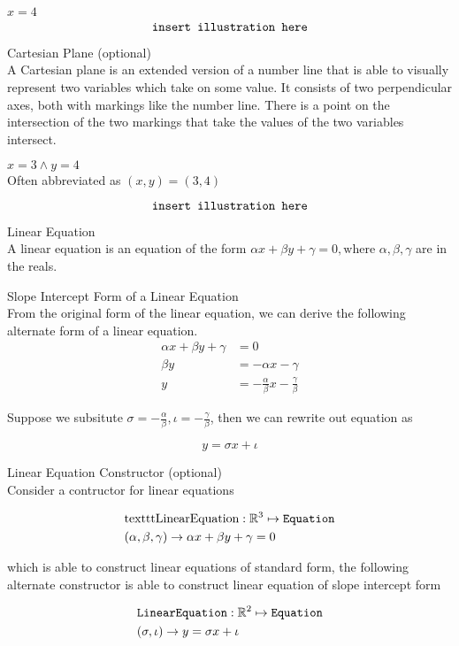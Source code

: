 \documentclass{book}
\begin{document}
  {\example $x = 4$ \\
    $$\text{\texttt{insert illustration here}}$$
  }

  {\remark Cartesian Plane (optional) \\
    A Cartesian plane is an extended version of a number line that is able to visually represent two variables which take on some value. It consists of two perpendicular axes, both with markings like the number line. There is a point on the intersection of the two markings that take the values of the two variables intersect.
  }\\

  {\example $x = 3 \land y = 4$ \\
    Often abbreviated as $(x, y) = (3, 4)$

    $$\text{\texttt{insert illustration here}}$$
  }

  {\remark Linear Equation \\
    A linear equation is an equation of the form $\alpha x + \beta y + \gamma = 0, \text{where } \alpha, \beta, \gamma$ are in the reals.
  }\\

  {\remark Slope Intercept Form of a Linear Equation \\
    From the original form of the linear equation, we can derive the following alternate form of a linear equation.
    \begin{align*}
      \alpha x + \beta y + \gamma & = 0\\
      \beta y & = - \alpha x - \gamma\\
      y & = -\frac{\alpha}{\beta} x - \frac{\gamma}{\beta}
    \end{align*}

    Suppose we subsitute $\sigma = - \frac{\alpha}{\beta}, \iota = - \frac{\gamma}{\beta}$, then we can rewrite out equation as

    $$y = \sigma x + \iota$$
  }

  {\remark Linear Equation Constructor (optional) \\
    Consider a contructor for linear equations

    \begin{align*}
      & \text{texttt{LinearEquation}}: \mathbb{R}^3 \mapsto \text{\texttt{Equation}}\\
      & (\alpha, \beta, \gamma) \to \alpha x + \beta y + \gamma = 0
    \end{align*}

    which is able to construct linear equations of standard form, the following alternate constructor is able to construct linear equation of slope intercept form

    \begin{align*}
      & \text{\texttt{LinearEquation}}: \mathbb{R}^2 \mapsto \text{\texttt{Equation}}\\
      & (\sigma, \iota) \to y = \sigma x + \iota
    \end{align*}
  }
\end{document}
